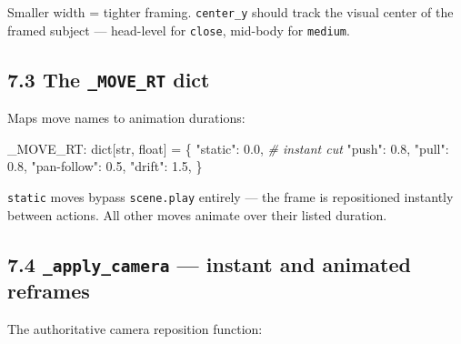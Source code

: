\documentclass[
  11pt,
]{book}
\newenvironment{Shaded}{}{}
\newcommand{\BuiltInTok}[1]{\textcolor[rgb]{0.00,0.50,0.00}{#1}}
\newcommand{\CommentTok}[1]{\textcolor[rgb]{0.38,0.63,0.69}{\textit{#1}}}
\newcommand{\FloatTok}[1]{\textcolor[rgb]{0.25,0.63,0.44}{#1}}
\newcommand{\NormalTok}[1]{#1}
\newcommand{\OperatorTok}[1]{\textcolor[rgb]{0.40,0.40,0.40}{#1}}
\newcommand{\StringTok}[1]{\textcolor[rgb]{0.25,0.44,0.63}{#1}}
\begin{document}
Smaller width = tighter framing. \texttt{center\_y} should track the
visual center of the framed subject --- head-level for \texttt{close},
mid-body for \texttt{medium}.

\subsection{\texorpdfstring{7.3 The \texttt{\_MOVE\_RT}
dict}{7.3 The \_MOVE\_RT dict}}\label{the-_move_rt-dict}

Maps move names to animation durations:

\begin{Shaded}
\begin{Highlighting}[]
\NormalTok{\_MOVE\_RT: }\BuiltInTok{dict}\NormalTok{[}\BuiltInTok{str}\NormalTok{, }\BuiltInTok{float}\NormalTok{] }\OperatorTok{=}\NormalTok{ \{}
    \StringTok{"static"}\NormalTok{:     }\FloatTok{0.0}\NormalTok{,    }\CommentTok{\# instant cut}
    \StringTok{"push"}\NormalTok{:       }\FloatTok{0.8}\NormalTok{,}
    \StringTok{"pull"}\NormalTok{:       }\FloatTok{0.8}\NormalTok{,}
    \StringTok{"pan{-}follow"}\NormalTok{: }\FloatTok{0.5}\NormalTok{,}
    \StringTok{"drift"}\NormalTok{:      }\FloatTok{1.5}\NormalTok{,}
\NormalTok{\}}
\end{Highlighting}
\end{Shaded}

\texttt{static} moves bypass \texttt{scene.play} entirely --- the frame
is repositioned instantly between actions. All other moves animate over
their listed duration.

\subsection{\texorpdfstring{7.4 \texttt{\_apply\_camera} --- instant and
animated
reframes}{7.4 \_apply\_camera --- instant and animated reframes}}\label{apply_camera-instant-and-animated-reframes}

The authoritative camera reposition function:
\end{document}
